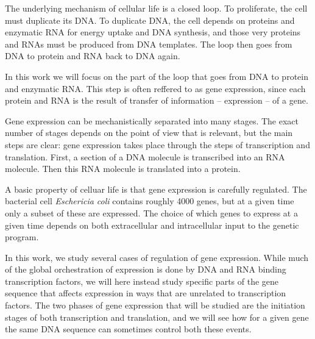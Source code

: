 %

The underlying mechanism of cellular life is a closed loop. To proliferate, the
cell must duplicate its DNA. To duplicate DNA, the cell depends on proteins and
enzymatic RNA for energy uptake and DNA synthesis, and those very proteins and
RNAs must be produced from DNA templates. The loop then goes from DNA to
protein and RNA back to DNA again.

In this work we will focus on the part of the loop that goes from DNA to
protein and enzymatic RNA. This step is often reffered to as gene expression,
since each protein and RNA is the result of transfer of information --
expression -- of a gene.

Gene expression can be mechanistically separated into many stages. The exact
number of stages depends on the point of view that is relevant, but the main
steps are clear: gene expression takes place through the steps of transcription
and translation. First, a section of a DNA molecule is transcribed into an RNA
molecule. Then this RNA molecule is translated into a protein.

A basic property of celluar life is that gene expression is carefully
regulated. The bacterial cell \textit{Eschericia coli} contains roughly 4000
genes, but at a given time only a subset of these are expressed. The choice of
which genes to express at a given time depends on both extracellular and
intracellular input to the genetic program.

In this work, we study several cases of regulation of gene expression. While
much of the global orchestration of expression is done by DNA and RNA binding
transcription factors, we will here instead study specific parts of the gene
sequence that affects expression in ways that are unrelated to transcription
factors. The two phases of gene expression that will be studied are the
initiation stages of both transcription and translation, and we will see how
for a given gene the same DNA sequence can sometimes control both these events.
